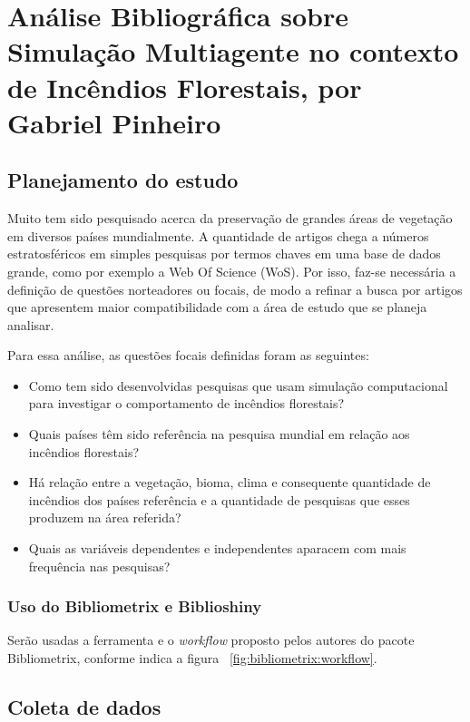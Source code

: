 \chapter{Análise Bibliográfica sobre Simulação Multiagente no contexto de Incêndios Florestais, por Gabriel Pinheiro\label{chap:bibliometria:pinheirogh}}

\section{Planejamento do estudo\label{pinheirogh:questoes}}
Muito tem sido pesquisado acerca da preservação de grandes áreas de vegetação em diversos países mundialmente. A quantidade de artigos chega a números estratosféricos em simples pesquisas por termos chaves em uma base de dados grande, como por exemplo a Web Of Science (WoS). Por isso, faz-se necessária a definição de questões norteadores ou focais, de modo a refinar a busca por artigos que apresentem maior compatibilidade com a área de estudo que se planeja analisar.

Para essa análise, as questões focais definidas foram as seguintes:
\begin{itemize}
    \item Como tem sido desenvolvidas pesquisas que usam simulação computacional para investigar o comportamento de incêndios florestais?
    \item Quais países têm sido referência na pesquisa mundial em relação aos incêndios florestais?
    \item Há relação entre a vegetação, bioma, clima e consequente quantidade de incêndios dos países referência e a quantidade de pesquisas que esses produzem na área referida?
    \item Quais as variáveis dependentes e independentes aparacem com mais frequência nas pesquisas?
\end{itemize}

\subsection{Uso do Bibliometrix e Biblioshiny}
Serão usadas a ferramenta e o \textit{workflow} proposto pelos autores do pacote Bibliometrix, conforme indica a figura ~\ref{fig:bibliometrix:workflow}.


\section{Coleta de dados\label{pinheirogh:coleta}}

